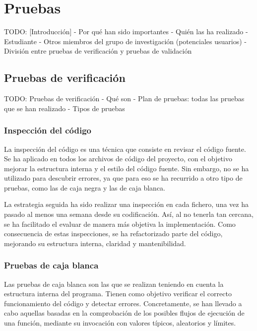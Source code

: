 \chapter{Pruebas\label{cap:pruebas}}

TODO: [Introducción]
- Por qué han sido importantes
- Quién las ha realizado
  - Estudiante
    - Otros miembros del grupo de investigación (potenciales usuarios)
- División entre pruebas de verificación y pruebas de validación

\section{Pruebas de verificación\label{sec:pb:verificacion}}

TODO: Pruebas de verificación
- Qué son
- Plan de pruebas: todas las pruebas que se han realizado
- Tipos de pruebas

\subsection*{Inspección del código\label{ssec:pb:inspeccion}}

La inspección del código es una técnica que consiste en revisar el código fuente.
Se ha aplicado en todos los archivos de código del proyecto, con el objetivo mejorar la estructura interna y el estilo del código fuente.
Sin embargo, no se ha utilizado para descubrir errores, ya que para eso se ha recurrido a otro tipo de pruebas, como las de caja negra y las de caja blanca.

La estrategia seguida ha sido realizar una inspección en cada fichero, una vez ha pasado al menos una semana desde su codificación.
Así, al no tenerla tan cercana, se ha facilitado el evaluar de manera más objetiva la implementación.
Como consecuencia de estas inspecciones, se ha refactorizado parte del código, mejorando su estructura interna, claridad y mantenibilidad.

\subsection*{Pruebas de caja blanca\label{ssec:pb:caja_blanca}}

Las pruebas de caja blanca son las que se realizan teniendo en cuenta la estructura interna del programa.
Tienen como objetivo verificar el correcto funcionamiento del código y detectar errores.
Concretamente, se han llevado a cabo aquellas basadas en la comprobación de los posibles flujos de ejecución de una función, mediante su invocación con valores típicos, aleatorios y límites.

